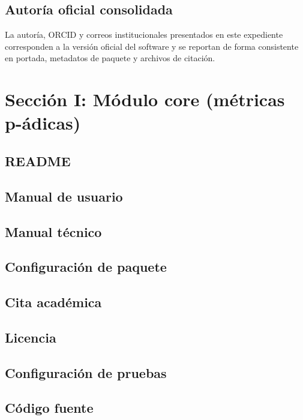 \documentclass[11pt]{article}
\begin{document}
\subsection{Autoría oficial consolidada}
La autoría, ORCID y correos institucionales presentados en este expediente
corresponden a la versión oficial del software y se reportan de forma
consistente en portada, metadatos de paquete y archivos de citación.

\section{Sección I: Módulo core (métricas p-ádicas)}
\subsection{README}
\subsection{Manual de usuario}
\subsection{Manual técnico}
\subsection{Configuración de paquete}
\subsection{Cita académica}
\subsection{Licencia}
\subsection{Configuración de pruebas}
\subsection{Código fuente}
\end{document}
